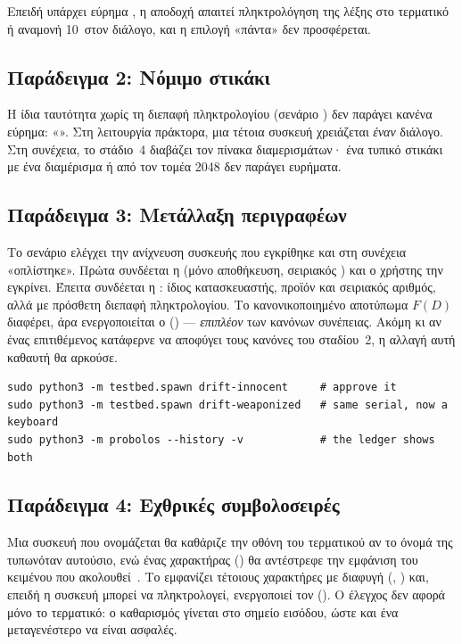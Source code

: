 Επειδή υπάρχει εύρημα \sevC, η αποδοχή απαιτεί πληκτρολόγηση της λέξης
 στο τερματικό ή αναμονή 10\, στον διάλογο, και η επιλογή
«πάντα» δεν προσφέρεται.

\subsection{Παράδειγμα 2: Νόμιμο στικάκι}

Η ίδια ταυτότητα χωρίς τη διεπαφή πληκτρολογίου (σενάριο ) δεν
παράγει κανένα εύρημα: «». Στη
λειτουργία πράκτορα, μια τέτοια συσκευή χρειάζεται \emph{έναν} διάλογο. Στη
συνέχεια, το στάδιο~4 διαβάζει τον πίνακα διαμερισμάτων· ένα τυπικό στικάκι με
ένα διαμέρισμα  ή  από τον τομέα 2048 δεν παράγει ευρήματα.

\subsection{Παράδειγμα 3: Μετάλλαξη περιγραφέων}
\label{sec:example-drift}

Το σενάριο ελέγχει την ανίχνευση συσκευής που εγκρίθηκε και στη συνέχεια
«οπλίστηκε». Πρώτα συνδέεται η  (μόνο αποθήκευση, σειριακός
) και ο χρήστης την εγκρίνει. Έπειτα συνδέεται η
: ίδιος κατασκευαστής, προϊόν και σειριακός αριθμός, αλλά
με πρόσθετη διεπαφή πληκτρολογίου. Το κανονικοποιημένο αποτύπωμα $F(D)$
διαφέρει, άρα ενεργοποιείται ο  (\sevC) — \emph{επιπλέον}
των κανόνων συνέπειας. Ακόμη κι αν ένας επιτιθέμενος κατάφερνε να αποφύγει τους
κανόνες του σταδίου~2, η αλλαγή αυτή καθαυτή θα αρκούσε.

\begin{lstlisting}[language=shell,caption={Εκτέλεση του σεναρίου μετάλλαξης.},label=lst:drift]
sudo python3 -m testbed.spawn drift-innocent     # approve it
sudo python3 -m testbed.spawn drift-weaponized   # same serial, now a keyboard
sudo python3 -m probolos --history -v            # the ledger shows both
\end{lstlisting}

\subsection{Παράδειγμα 4: Εχθρικές συμβολοσειρές}

Μια συσκευή  που ονομάζεται \code{"Logitech\textbackslash x1b[2J USB Keyboard"}
θα καθάριζε την οθόνη του τερματικού αν το όνομά της τυπωνόταν αυτούσιο, ενώ
ένας χαρακτήρας  () θα αντέστρεφε την
εμφάνιση του κειμένου που ακολουθεί~\cite{boucher2023trojansource}. Το
\Probolos{} εμφανίζει τέτοιους χαρακτήρες με διαφυγή (,
) και, επειδή η συσκευή μπορεί να πληκτρολογεί,
ενεργοποιεί τον  (\sevC). Ο έλεγχος δεν αφορά μόνο
το τερματικό: ο καθαρισμός γίνεται στο σημείο εισόδου, ώστε και ένα μεταγενέστερο
 να είναι ασφαλές.

